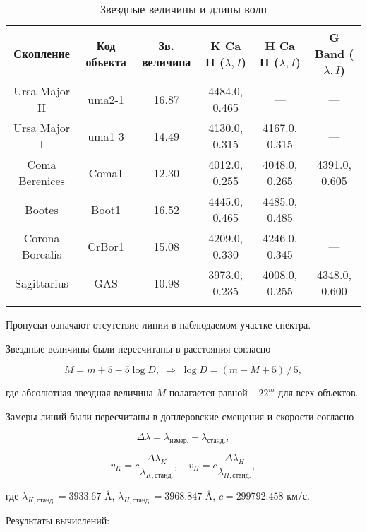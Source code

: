 \begin{table}[h]
  \centering
  \caption{Звездные величины и длины волн}
  \begin{tabular}{cccccc}
    \toprule
    Скопление &
    Код объекта &
    Зв. величина &
    K Ca II ($ \lambda, I $) &
    H Ca II ($ \lambda, I $) &
    G Band ($ \lambda, I $) \\
    \midrule
    Ursa Major II & uma2-1 & 16.87 & 4484.0, 0.465 & --- & --- \\
    \arrayrulecolor{black!40}
    \midrule
    Ursa Major I & uma1-3 & 14.49 & 4130.0, 0.315 & 4167.0, 0.315 & --- \\
    \midrule
    Coma Berenices & Coma1 & 12.30 & 4012.0, 0.255 & 4048.0, 0.265 & 4391.0, 0.605 \\
    \midrule
    Bootes & Boot1 & 16.52 & 4445.0, 0.465 & 4485.0, 0.485 & --- \\
    \midrule
    Corona Borealis & CrBor1 & 15.08 & 4209.0, 0.330 & 4246.0, 0.345 & --- \\
    \midrule
    Sagittarius & GAS & 10.98 & 3973.0, 0.235 & 4008.0, 0.255 & 4348.0, 0.600 \\
    \arrayrulecolor{black}
    \bottomrule
  \end{tabular}
\end{table}

Пропуски означают отсутствие линии в наблюдаемом участке спектра. \npar

Звездные величины были пересчитаны в расстояния согласно

$$
M = m + 5 - 5 \log{D}, \; \Longrightarrow \; \log{D} = (m - M + 5) \, / \, 5,
$$
\su

где абсолютная звездная величина $M$ полагается равной $-22^m$ для всех объектов. \npar

Замеры линий были пересчитаны в доплеровские смещения и скорости согласно

$$
\Delta \lambda = \lambda_{\text{измер.}} - \lambda_{\text{станд.}},
$$
\su

\su\su
$$
v_K = c \frac{\Delta \lambda_K}{\lambda_{K, \text{станд.}}}, \quad
v_H = c \frac{\Delta \lambda_H}{\lambda_{H, \text{станд.}}},
$$
\sd

где $ \lambda_{K, \text{станд.}} = 3933.67 $ \AA, $ \lambda_{H, \text{станд.}} = 3968.847 $ \AA, $ c = 299792.458 $ км/с. \npar

\newpage

Результаты вычислений:

